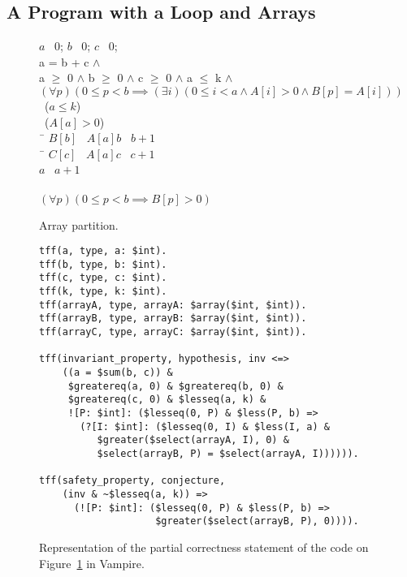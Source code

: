 \subsection{A Program with a Loop and Arrays}

\begin{figure*}[bt]
{
  \begin{center}
    \parbox{0cm}{
  \begin{tabbing}
    $a$ \ass\ $0$; $b$ \ass\ $0$; $c$ \ass\ $0$; \\[.5em]
     a = b + c $\wedge$ \\
    {\color{white}} a $\geq$ 0 $\wedge$ b $\geq$ 0 $\wedge$ c $\geq$
    0 $\wedge$ a $\leq$ k $\wedge$ \\
    {\color{white}} $(\forall p) (0\leq p<b \implies
    (\exists i) (0 \leq i < a \wedge A[i] > 0 \wedge B[p] = A[i]))$\\[1em]
    \WHILE\ ($a \leq k$) \DO \\ \inc
      \IF\ ($A[a] > 0$) \\ \inc
        \THEN\ \=\+ $B[b]$ \ass\ $A[a]$\semicol $b$ \ass\ $b+1$\semicol \\ \dec
        \ELSE\ \=\+ $C[c]$ \ass\ $A[a]$\semicol $c$ \ass\ $c+1$\semicol \\ \dec \dec
      $a$ \ass\ $a+1$\semicol \\ \dec
    \OD\\[.5em]
     $(\forall p)(0 \leq p<b \implies B[p]> 0)$
  \end{tabbing}
    }
  \end{center}
  \caption{Array partition.\label{fig:partition}}
}
\end{figure*}

\begin{figure*}[tb]
\begin{lstlisting}[language=tptp]
tff(a, type, a: $int).
tff(b, type, b: $int).
tff(c, type, c: $int).
tff(k, type, k: $int).
tff(arrayA, type, arrayA: $array($int, $int)).
tff(arrayB, type, arrayB: $array($int, $int)).
tff(arrayC, type, arrayC: $array($int, $int)).

tff(invariant_property, hypothesis, inv <=>
    ((a = $sum(b, c)) &
     $greatereq(a, 0) & $greatereq(b, 0) &
     $greatereq(c, 0) & $lesseq(a, k) &
     ![P: $int]: ($lesseq(0, P) & $less(P, b) =>
       (?[I: $int]: ($lesseq(0, I) & $less(I, a) &
          $greater($select(arrayA, I), 0) &
          $select(arrayB, P) = $select(arrayA, I)))))).

tff(safety_property, conjecture,
    (inv & ~$lesseq(a, k)) =>
      (![P: $int]: ($lesseq(0, P) & $less(P, b) =>
                    $greater($select(arrayB, P), 0)))).
\end{lstlisting}
\caption{Representation of the partial correctness statement of the code on Figure~\ref{fig:partition} in Vampire\label{fig:loop_safety_Vampire}.}
\end{figure*}

